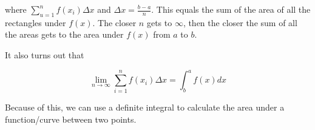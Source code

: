 \noindent where $\sum_{u=1}^n f(x_i)\Delta x$ and $\Delta x = \frac{b - a}{n}$. This equals the sum of the area of all the rectangles under $f(x)$. The closer $n$ gets to $\infty$, then the closer the sum of all the areas gets to the area under $f(x)$ from $a$ to $b$. 

\vspace{1em}

\noindent It also turns out that 

\begin{equation*}
    \lim_{n \rightarrow \infty} \sum_{i = 1}^n f(x_i) \Delta x = \int_{b}^a f(x)dx
\end{equation*}

\noindent Because of this, we can use a definite integral to calculate the area under a function/curve between two points.